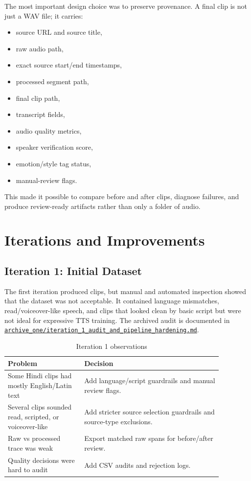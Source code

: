 \documentclass[11pt]{article}
\begin{document}
The most important design choice was to preserve provenance. A final clip is not just a WAV file; it carries:
\begin{itemize}
    \item source URL and source title,
    \item raw audio path,
    \item exact source start/end timestamps,
    \item processed segment path,
    \item final clip path,
    \item transcript fields,
    \item audio quality metrics,
    \item speaker verification score,
    \item emotion/style tag status,
    \item manual-review flags.
\end{itemize}

This made it possible to compare before and after clips, diagnose failures, and produce review-ready artifacts rather than only a folder of audio.

\section{Iterations and Improvements}

\subsection{Iteration 1: Initial Dataset}

The first iteration produced clips, but manual and automated inspection showed that the dataset was not acceptable. It contained language mismatches, read/voiceover-like speech, and clips that looked clean by basic script but were not ideal for expressive TTS training. The archived audit is documented in \href{https://github.com/Rushabh333/sarvam-indian-tts-pipeline/blob/main/archive_one/iteration_1_audit_and_pipeline_hardening.md}{\texttt{archive\_one/iteration\_1\_audit\_and\_pipeline\_hardening.md}}.

\begin{table}[H]
\centering
\caption{Iteration 1 observations}
\begin{tabular}{p{0.31\linewidth}p{0.56\linewidth}}
\toprule
\textbf{Problem} & \textbf{Decision} \\
\midrule
Some Hindi clips had mostly English/Latin text & Add language/script guardrails and manual review flags. \\
Several clips sounded read, scripted, or voiceover-like & Add stricter source selection guardrails and source-type exclusions. \\
Raw vs processed trace was weak & Export matched raw spans for before/after review. \\
Quality decisions were hard to audit & Add CSV audits and rejection logs. \\
\bottomrule
\end{tabular}
\end{table}
\end{document}
